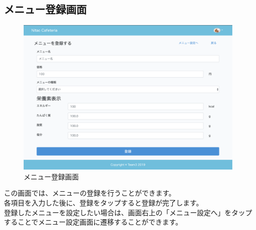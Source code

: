 \documentclass[a4paper]{jsarticle}
\begin{document}
\subsection{メニュー登録画面}
\begin{figure}[htbp]
\centering
\includegraphics[scale = 0.225]{image/create_menu.png}
\caption{メニュー登録画面}
\end{figure}
この画面では、メニューの登録を行うことができます。\\
各項目を入力した後に、登録をタップすると登録が完了します。\\
登録したメニューを設定したい場合は、画面右上の「メニュー設定へ」をタップすることでメニュー設定画面に遷移することができます。
\newpage
\end{document}

